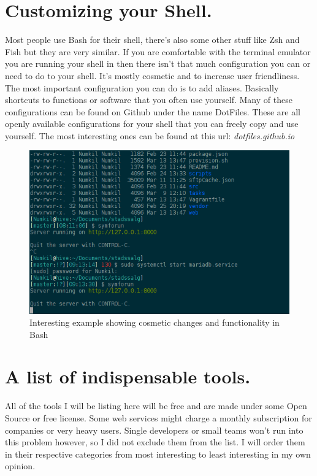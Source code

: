 \documentclass[paper=a4, fontsize=10pt]{scrartcl} %
\numberwithin{equation}{section} %
\numberwithin{figure}{section} %
\numberwithin{table}{section} %
\begin{document}
\newpage
\section{Customizing your Shell.}
Most people use Bash\cite{bash} for their shell, there's also some other stuff
like Zsh\cite{zsh}
and Fish\cite{fish} but they are very similar. If you are comfortable with the terminal
emulator you are running your shell in then there isn't that much configuration
you can or need to do to your shell. It's mostly cosmetic and to increase user
friendliness. The most important configuration you can do is to add aliases.
Basically shortcuts to functions or software that you often use yourself. Many of
these configurations can be found on Github under the name DotFiles. These are
all openly available configurations for your shell that you can freely copy and
use yourself. The most interesting ones can be found at this url:\newline
\emph{dotfiles.github.io}\newline
\begin{figure}[h]
    \centering
    \includegraphics[scale=0.5]{bashexample.png}
    \caption{Interesting example showing cosmetic changes and functionality in Bash}
\end{figure}


\section{A list of indispensable tools.}
All of the tools I will be listing here will be free and are made under some Open
Source or free license. Some web services might charge a monthly subscription for
companies or very heavy users. Single developers or small teams won't run into
this problem however, so I did not exclude them from the list.  I will order
them in their respective categories from most interesting to least interesting in my own opinion.
\end{document}
